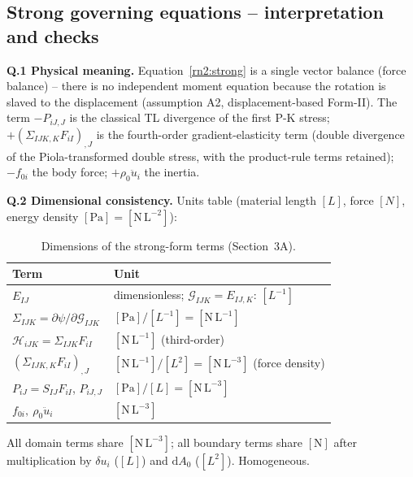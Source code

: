 \documentclass[11pt]{article}
\begin{document}
\subsection{Strong governing equations -- interpretation and checks}
\label{subsec:strongnotes}

\textbf{Q.1 Physical meaning.} Equation~\eqref{rn2:strong} is a single vector balance (force balance) -- there is no independent moment equation because the rotation is slaved to the displacement (assumption A2, displacement-based Form-II). The term $-P_{iJ,J}$ is the classical TL divergence of the first P-K stress; $+(\Sigma_{IJK,K}F_{iI})_{,J}$ is the fourth-order gradient-elasticity term (double divergence of the Piola-transformed double stress, with the product-rule terms retained); $-f_{0i}$ the body force; $+\rho_0\ddot{u}_i$ the inertia.

\textbf{Q.2 Dimensional consistency.} Units table (material length $[L]$, force $[N]$, energy density $[\mathrm{Pa}]=[\mathrm{N\,L^{-2}}]$):

\begin{table}[h]
\centering
\caption{Dimensions of the strong-form terms (Section~3A).}
\label{rn2:dimtab}
\begin{tabular}{ll}
\toprule
Term & Unit \\
\midrule
$E_{IJ}$ & dimensionless; $\mathcal{G}_{IJK}=E_{IJ,K}$: $[L^{-1}]$ \\
$\Sigma_{IJK}=\partial\psi/\partial\mathcal{G}_{IJK}$ & $[\mathrm{Pa}]/[L^{-1}]=[\mathrm{N\,L^{-1}}]$ \\
$\mathcal{H}_{iJK}=\Sigma_{IJK}F_{iI}$ & $[\mathrm{N\,L^{-1}}]$ (third-order) \\
$(\Sigma_{IJK,K}F_{iI})_{,J}$ & $[\mathrm{N\,L^{-1}}]/[L^{2}]=[\mathrm{N\,L^{-3}}]$ (force density) \\
$P_{iJ}=S_{IJ}F_{iI}$, $P_{iJ,J}$ & $[\mathrm{Pa}]/[L]=[\mathrm{N\,L^{-3}}]$ \\
$f_{0i},\ \rho_0\ddot{u}_i$ & $[\mathrm{N\,L^{-3}}]$ \\
\bottomrule
\end{tabular}
\end{table}

All domain terms share $[\mathrm{N\,L^{-3}}]$; all boundary terms share $[\mathrm{N}]$ after multiplication by $\delta u_i$ ($[L]$) and $\mathrm{d}A_0$ ($[L^2]$). Homogeneous. \checkmark
\end{document}
